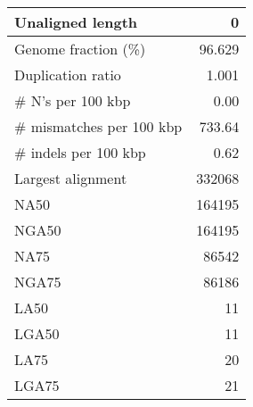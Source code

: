 \documentclass[12pt,a4paper]{article}
\begin{document}
\begin{table}[ht]
\begin{center}
\begin{tabular}{|l*{1}{|r}|}
Unaligned length & 0 \\ \hline
Genome fraction (\%) & 96.629 \\ \hline
Duplication ratio & 1.001 \\ \hline
\# N's per 100 kbp & 0.00 \\ \hline
\# mismatches per 100 kbp & 733.64 \\ \hline
\# indels per 100 kbp & 0.62 \\ \hline
Largest alignment & 332068 \\ \hline
NA50 & 164195 \\ \hline
NGA50 & 164195 \\ \hline
NA75 & 86542 \\ \hline
NGA75 & 86186 \\ \hline
LA50 & 11 \\ \hline
LGA50 & 11 \\ \hline
LA75 & 20 \\ \hline
LGA75 & 21 \\ \hline
\end{tabular}
\end{center}
\end{table}
\end{document}
